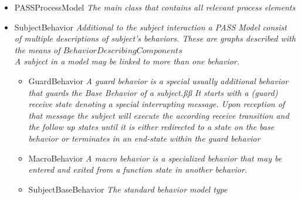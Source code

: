 \begin{itemize}
\begin{itemize}
	\item PASSProcessModel \linebreak \textit{The main class that contains all relevant process elements}
	\item SubjectBehavior \linebreak \textit{Additional to the subject interaction a PASS Model consist of multiple descriptions of subject's behaviors. These are graphs described with the means of $BehaviorDescribingComponents$ \\
	A subject in a model may be linked to more than one behavior.}
	\begin{itemize}
		\item GuardBehavior \linebreak \textit{A guard behavior is a special usually additional behavior that guards the Base Behavior of a subject.ßß
		It starts with a (guard) receive state denoting a special interrupting message. Upon reception of that message the subject will execute the according receive transition and the follow up states until it is either redirected to a state on the base behavior or terminates in an end-state within the guard behavior}
		\item MacroBehavior \linebreak \textit{A macro behavior is a specialized behavior that may be entered and exited from a function state in another behavior.}
		\item SubjectBaseBehavior \linebreak \textit{The standard behavior model type}
	\end{itemize}
\end{itemize}
	

\end{itemize}
